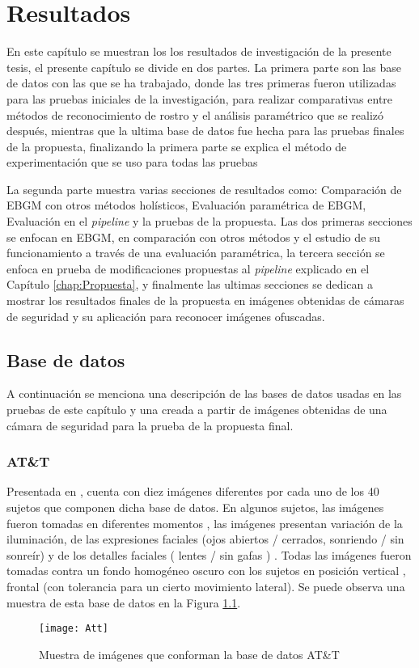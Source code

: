 \chapter{Resultados} \label{chap:Resultados}


En este capítulo se muestran los los resultados de investigación de la presente tesis, el presente capítulo se divide en dos partes. La primera parte son las base de datos con las que se ha trabajado, donde las tres primeras fueron utilizadas para las pruebas iniciales de la investigación, para realizar comparativas entre métodos de reconocimiento de rostro y el análisis paramétrico que se realizó después, mientras que la ultima base de datos fue hecha para las pruebas finales de la propuesta, finalizando la primera parte se explica el método de experimentación que se uso para todas las pruebas


La segunda parte muestra varias secciones de resultados como: Comparación de \ac{EBGM} con otros métodos holísticos, Evaluación paramétrica de \ac{EBGM}, Evaluación en el \textit{pipeline} y la pruebas de la propuesta. Las dos primeras secciones se enfocan en \ac{EBGM}, en comparación con otros métodos y el estudio de su funcionamiento a través de una evaluación paramétrica, la tercera sección se enfoca en prueba de modificaciones propuestas al \textit{pipeline} explicado en el Capítulo \ref{chap:Propuesta}, y finalmente las ultimas secciones se dedican a mostrar los resultados finales de la propuesta en imágenes obtenidas de cámaras de seguridad y su aplicación para reconocer imágenes ofuscadas.

\section{Base de datos}
A continuación se menciona una descripción de las bases de datos usadas en las pruebas de este capítulo y una creada a partir de imágenes obtenidas de una cámara de seguridad para la prueba de la propuesta final.
\subsection{AT\&T}
Presentada en \cite{ATT}, cuenta con diez imágenes diferentes por cada uno de los 40 sujetos que componen dicha base de datos. En algunos sujetos, las imágenes fueron tomadas en diferentes momentos , las imágenes presentan variación de la iluminación, de las expresiones faciales (ojos abiertos / cerrados, sonriendo / sin sonreír) y de los detalles faciales ( lentes / sin gafas ) . Todas las imágenes fueron tomadas contra un fondo homogéneo oscuro con los sujetos en posición vertical , frontal (con tolerancia para un cierto movimiento lateral). Se puede observa una muestra de esta base de datos en la Figura \ref{Att}.
\begin{figure}[h]
	\centering
	\texttt{[image: Att]}
    \caption{Muestra de imágenes que conforman la base de datos AT\&T}
    \label{Att}
\end{figure}
